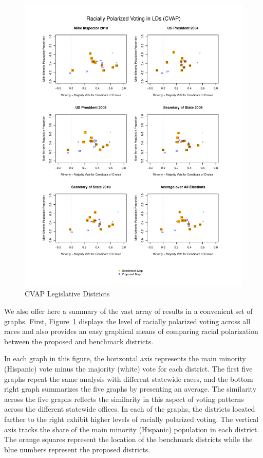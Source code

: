 \documentclass[12pt]{article}
\begin{document}
\begin{figure}[p!h]
\begin{center}
\includegraphics[scale=.8]{figs/cvap_ld_polarization.pdf}
\caption{\label{cvap_ld_polarization}CVAP Legislative Districts}
\end{center}
\end{figure}

We also offer here a summary of the vast array of results in a
convenient set of graphs.  First, Figure~\ref{cvap_ld_polarization}
displays the level of racially polarized voting across all races and
also provides an easy graphical means of comparing racial polarization
between the proposed and benchmark districts.

In each graph in this figure, the horizontal axis represents the main
minority (Hispanic) vote minus the majority (white) vote for each
district.  The first five graphs repeat the same analysis with
different statewide races, and the bottom right graph summarizes the
five graphs by presenting an average.  The similarity across the five
graphs reflects the similarity in this aspect of voting patterns
across the different statewide offices.  In each of the graphs, the
districts located farther to the right exhibit higher levels of
racially polarized voting. The vertical axis tracks the share of the
main minority (Hispanic) population in each district. The orange
squares represent the location of the benchmark districts while the
blue numbers represent the proposed districts.
\end{document}
